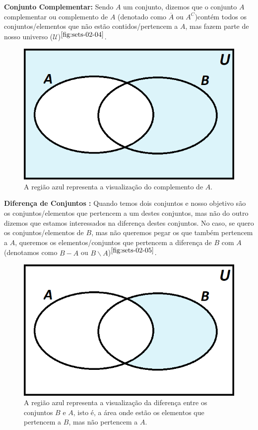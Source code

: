     \textbf{Conjunto Complementar:} Sendo $A$ um conjunto, dizemos que o conjunto $A$ complementar ou complemento de $A$ (denotado como $\overline A$ ou $A^C$)contém todos os conjuntos/elementos que não estão contidos/pertencem a $A$, mas fazem parte de nosso universo ($\mathcal U$)$^{\ref{fig:sets-02-04}}$.
    
    \begin{figure}[hbt!]
        \centering      
        \includegraphics[width = 7 cm]{figures/sets/fig-sets-02-04.png}
        \caption{A região azul representa a visualização do complemento de $A$.}
        \label{fig:sets-02-04}
    \end{figure}
    
    \textbf{Diferença de Conjuntos :} Quando temos dois conjuntos e nosso objetivo são os conjuntos/elementos que pertencem a um destes conjuntos, mas não do outro dizemos que estamos interessados na diferença destes conjuntos. No caso, se quero os conjuntos/elementos de $B$, mas não queremos pegar os que também pertencem a $A$, queremos os elementos/conjuntos que pertencem a diferença de $B$ com $A$ (denotamos como $B-A$ ou $B \backslash A$)$^{\ref{fig:sets-02-05}}$.
    
    \begin{figure}[hbt!]
        \centering      
        \includegraphics[width = 7 cm]{figures/sets/fig-sets-02-05.png}
        \caption{A região azul representa a visualização da diferença entre os conjuntos $B$ e $A$, isto é, a área onde estão os elementos que pertencem a $B$, mas não pertencem a $A$.}
        \label{fig:sets-02-05}
    \end{figure}
    
